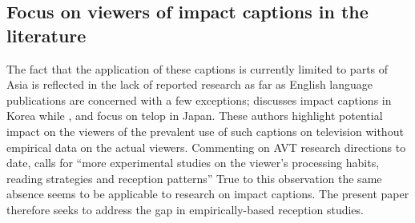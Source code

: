 \documentclass[output=paper]{langsci/langscibook}
\begin{document}
\subsection{Focus on viewers of impact captions in the literature}

The fact that the application of these captions is currently limited to parts of Asia is reflected in the lack of reported research as far as English language publications are concerned with a few exceptions; \citet{Park2009} discusses impact captions in Korea while \citet{ohagan2010}, \citet{Sasamoto2014} and \citet{maree2015} focus on telop in Japan. These authors highlight potential impact on the viewers of the prevalent use of such captions on television without empirical data on the actual viewers. Commenting on AVT research directions to date, \citet[57]{gambier2013} calls for ``more experimental studies on the viewer's processing habits, reading strategies and reception patterns'' True to this observation the same absence seems to be applicable to research on impact captions. The present paper therefore seeks to address the gap in empirically-based reception studies.
\end{document}
